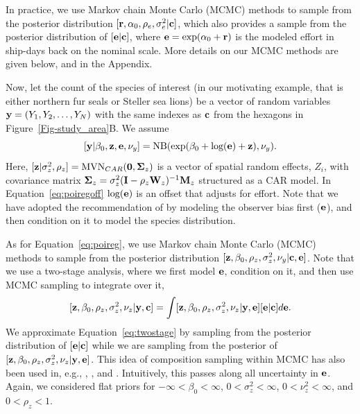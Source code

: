 \documentclass[11pt, titlepage]{article}
\begin{document}
\begin{spacing}{1.9}
\begin{flushleft}
In practice, we use Markov chain Monte Carlo (MCMC) methods to sample from the posterior distribution $[\mathbf{r}, \alpha_{0}, \rho_{e}, \sigma^{2}_{e}|\mathbf{c}]$, which also provides a sample from the posterior distribution of $[\mathbf{e}|\mathbf{c}]$, where $\mathbf{e} = \exp(\alpha_{0} + \mathbf{r})$ is the modeled effort in ship-days back on the nominal scale.  More details on our MCMC methods are given below, and in the Appendix.

Now, let the count of the species of interest (in our motivating example, that is either northern fur seals or Steller sea lions) be a vector of random variables $\mathbf{y} = (Y_{1}, Y_{2}, \ldots, Y_{N})$ with the same indexes as $\mathbf{c}$ from the hexagons in Figure~\ref{Fig-study_area}B.  We assume
\begin{equation} \label{eq:poiregoff}
[\mathbf{y}|\beta_{0},\mathbf{z},\mathbf{e},\nu_{y}] = \textrm{NB}(\exp(\beta_{0} + \textrm{log}(\mathbf{e}) + \mathbf{z}), \nu_{y}).
\end{equation}
Here, $[\mathbf{z}|\sigma^{2}_{z}, \rho_{z}] = \textrm{MVN}_{CAR}(\mathbf{0},\mbox{\boldmath $\Sigma$}_{z})$ is a vector of spatial random effects, $Z_{i}$, with covariance matrix $\mbox{\boldmath $\Sigma$}_{z} = \sigma_{z}^{2}(\mathbf{I} - \rho_{z}\mathbf{W}_{z})^{-1}\mathbf{M}_{z}$ structured as a CAR model.  In Equation~\eqref{eq:poiregoff} $\textrm{log}(\mathbf{e})$ is an offset that adjusts for effort. Note that we have adopted the recommendation of \citet{warton_model-based_2013} by modeling the observer bias first ($\mathbf{e}$), and then condition on it to model the species distribution.

As for Equation~\eqref{eq:poireg}, we use Markov chain Monte Carlo (MCMC) methods to sample from the posterior distribution $[\mathbf{z}, \beta_{0}, \rho_{z}, \sigma^{2}_{z},\nu_{y}|\mathbf{c},\mathbf{e}]$. Note that we use a two-stage analysis, where we first model $\mathbf{e}$, condition on it, and then use MCMC sampling to integrate over it, 
\begin{equation} \label{eq:twostage}
[\mathbf{z}, \beta_{0}, \rho_{z}, \sigma^{2}_{z},\nu_{z}|\mathbf{y},\mathbf{c}] = \int[\mathbf{z}, \beta_{0}, \rho_{z}, \sigma^{2}_{z},\nu_{z}|\mathbf{y},\mathbf{e}][\mathbf{e}|\mathbf{c}]d\mathbf{e}.
\end{equation}
We approximate Equation~\eqref{eq:twostage} by sampling from the posterior distribution of $[\mathbf{e}|\mathbf{c}]$ while we are sampling from the posterior of $[\mathbf{z}, \beta_{0}, \rho_{z}, \sigma^{2}_{z},\nu_{z}|\mathbf{y},\mathbf{e}]$. This idea of composition sampling within MCMC has also been used in, e.g., \citet{BanerjeeEtAl2008Gaussianpredictiveprocess825}, \citet{hooten_agent-based_2010}, and \citet{babcock_lidar_2015}. Intuitively, this passes along all uncertainty in $\mathbf{e}$. Again, we considered flat priors for $-\infty < \beta_{0} < \infty$, $0 < \sigma^{2}_{z} < \infty$, $0 < \nu^{2}_{z} < \infty$, and $0 < \rho_{z} < 1$.


\end{flushleft}
\end{spacing}
\end{document}
